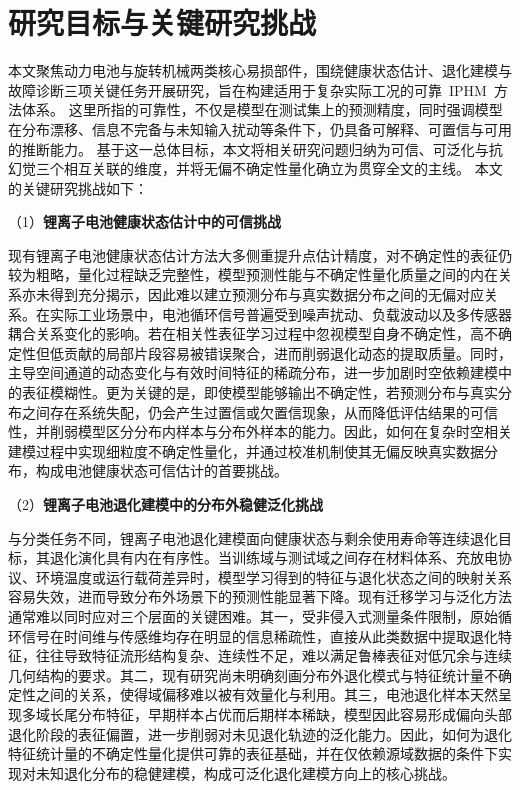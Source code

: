 \section{研究目标与关键研究挑战}\label{sec:Intro_research_objectives_and_challenges}

本文聚焦动力电池与旋转机械两类核心易损部件，围绕健康状态估计、退化建模与故障诊断三项关键任务开展研究，旨在构建适用于复杂实际工况的可靠~IPHM~方法体系。
这里所指的可靠性，不仅是模型在测试集上的预测精度，同时强调模型在分布漂移、信息不完备与未知输入扰动等条件下，仍具备可解释、可置信与可用的推断能力。
% 
基于这一总体目标，本文将相关研究问题归纳为可信、可泛化与抗幻觉三个相互关联的维度，并将无偏不确定性量化确立为贯穿全文的主线。
本文的关键研究挑战如下：

（1）\textbf{锂离子电池健康状态估计中的可信挑战}

现有锂离子电池健康状态估计方法大多侧重提升点估计精度，对不确定性的表征仍较为粗略，量化过程缺乏完整性，模型预测性能与不确定性量化质量之间的内在关系亦未得到充分揭示，因此难以建立预测分布与真实数据分布之间的无偏对应关系。在实际工业场景中，电池循环信号普遍受到噪声扰动、负载波动以及多传感器耦合关系变化的影响。若在相关性表征学习过程中忽视模型自身不确定性，高不确定性但低贡献的局部片段容易被错误聚合，进而削弱退化动态的提取质量。同时，主导空间通道的动态变化与有效时间特征的稀疏分布，进一步加剧时空依赖建模中的表征模糊性。更为关键的是，即使模型能够输出不确定性，若预测分布与真实分布之间存在系统失配，仍会产生过置信或欠置信现象，从而降低评估结果的可信性，并削弱模型区分分布内样本与分布外样本的能力。因此，如何在复杂时空相关建模过程中实现细粒度不确定性量化，并通过校准机制使其无偏反映真实数据分布，构成电池健康状态可信估计的首要挑战。

（2）\textbf{锂离子电池退化建模中的分布外稳健泛化挑战}

与分类任务不同，锂离子电池退化建模面向健康状态与剩余使用寿命等连续退化目标，其退化演化具有内在有序性。当训练域与测试域之间存在材料体系、充放电协议、环境温度或运行载荷差异时，模型学习得到的特征与退化状态之间的映射关系容易失效，进而导致分布外场景下的预测性能显著下降。现有迁移学习与泛化方法通常难以同时应对三个层面的关键困难。其一，受非侵入式测量条件限制，原始循环信号在时间维与传感维均存在明显的信息稀疏性，直接从此类数据中提取退化特征，往往导致特征流形结构复杂、连续性不足，难以满足鲁棒表征对低冗余与连续几何结构的要求。其二，现有研究尚未明确刻画分布外退化模式与特征统计量不确定性之间的关系，使得域偏移难以被有效量化与利用。其三，电池退化样本天然呈现多域长尾分布特征，早期样本占优而后期样本稀缺，模型因此容易形成偏向头部退化阶段的表征偏置，进一步削弱对未见退化轨迹的泛化能力。因此，如何为退化特征统计量的不确定性量化提供可靠的表征基础，并在仅依赖源域数据的条件下实现对未知退化分布的稳健建模，构成可泛化退化建模方向上的核心挑战。

